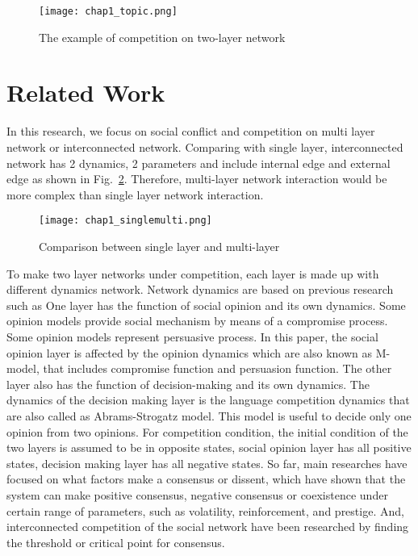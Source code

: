 \begin{figure}[!htb]
	\centering
	\texttt{[image: chap1\_topic.png]}
	\caption{The example of competition on two-layer network}
	\label{chap1_topic}
\end{figure}

\section{Related Work}
In this research, we focus on social conflict and competition on multi layer network or interconnected network. Comparing with single layer, interconnected network has 2 dynamics, 2 parameters and include internal edge and external edge as shown in Fig.~\ref{chap1_singlemulti}. Therefore, multi-layer network interaction would be more complex than single layer network interaction.
\begin{figure}[!htb]
	\centering
	\texttt{[image: chap1\_singlemulti.png]}
	\caption{Comparison between single layer and multi-layer}
	\label{chap1_singlemulti}
\end{figure}
To make two layer networks under competition, each layer is made up with different dynamics network. Network dynamics are based on previous research such as \parencite{alvarez2016} One layer has the function of social opinion and its own dynamics. Some opinion models provide social mechanism by means of a compromise process.\parencite{naim2003} Some opinion models represent persuasive process.\parencite{chau2014} In this paper, the social opinion layer is affected by the opinion dynamics which are also known as M-model\parencite{rocca2014}, that includes compromise function and persuasion function. The other layer also has the function of decision-making and its own dynamics. The dynamics of the decision making layer is the language competition dynamics that are also called as Abrams-Strogatz model\parencite{abrams2003, vazquez2010, patriarca2012}. This model is useful to decide only one opinion from two opinions. For competition condition, the initial condition of the two layers is assumed to be in opposite states, social opinion layer has all positive states, decision making layer has all negative states.
So far, main researches have focused on what factors make a consensus or dissent, which have shown that the system can make positive consensus, negative consensus or coexistence under certain range of parameters, such as volatility, reinforcement, and prestige.\parencite{alvarez2016} And, interconnected competition of the social network have been researched by finding the threshold or critical point for consensus.\parencite{alvarez2016, gomez2015, diep2017}
